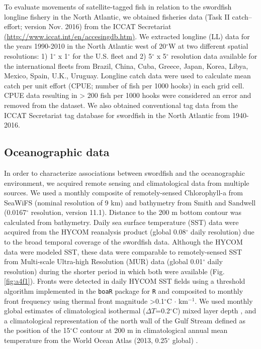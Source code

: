 To evaluate movements of satellite-tagged fish in relation to the swordfish longline fishery in the North Atlantic, we obtained fisheries data (Task II catch--effort; version Nov. 2016) from the ICCAT Secretariat \href{http://www.iccat.int/en/accesingdb.htm}{(http://www.iccat.int/en/accesingdb.htm)}. We extracted longline (LL) data for the years 1990-2010 in the North Atlantic west of 20$^{\circ}$W at two different spatial resolutions: 1) 1$^{\circ}$ x 1$^{\circ}$ for the U.S. fleet and 2) 5$^{\circ}$ x 5$^{\circ}$ resolution data available for the international fleets from Brazil, China, Cuba, Greece, Japan, Korea, Libya, Mexico, Spain, U.K., Uruguay. Longline catch data were used to calculate mean catch per unit effort (CPUE; number of fish per 1000 hooks) in each grid cell. CPUE data resulting in > 200 fish per 1000 hooks were considered an error and removed from the dataset. We also obtained conventional tag data from the ICCAT Secretariat tag database for swordfish in the North Atlantic from 1940-2016.

\subsection{Oceanographic data}

In order to characterize associations between swordfish and the
oceanographic environment, we acquired remote sensing and climatological data from multiple sources. We used a monthly composite of remotely-sensed Chlorophyll-a from SeaWiFS (nominal resolution of 9 km) and bathymetry from Smith and Sandwell (0.0167$^{\circ}$ resolution, version 11.1). Distance to the 200 m bottom contour was calculated from bathymetry. Daily sea surface temperature (SST) data were acquired from the HYCOM reanalysis product (global 0.08$^{\circ}$ daily resolution) due to the broad temporal coverage of the swordfish data. Although the HYCOM data were modeled SST, these data were comparable to remotely-sensed SST from Multi-scale Ultra-high Resolution (MUR) data (global 0.01$^{\circ}$ daily resolution) during the shorter period in which both were available (Fig. \ref{fig:a4f1}). Fronts were detected in daily HYCOM SST fields using a threshold algorithm \citep{Belkin2009} implemented in the \texttt{boaR} package \citep{Galuardi2017} for \texttt{R} and composited to monthly front frequency using thermal front magnitude >0.1$^{\circ}$C $\cdot$ km$^{-1}$. We used monthly global estimates of climatological isothermal ($\Delta T$=0.2$^{\circ}$C) mixed layer depth \citep{DeBoyerMontegut2004}, and a climatological representation of the north wall of the Gulf Stream defined as the position of the 15$^{\circ}$C contour at 200 m in climatological annual mean temperature from the World Ocean Atlas (2013, 0.25$^{\circ}$ global) \citep{Fuglister1963, Gaube2017DSR}.

